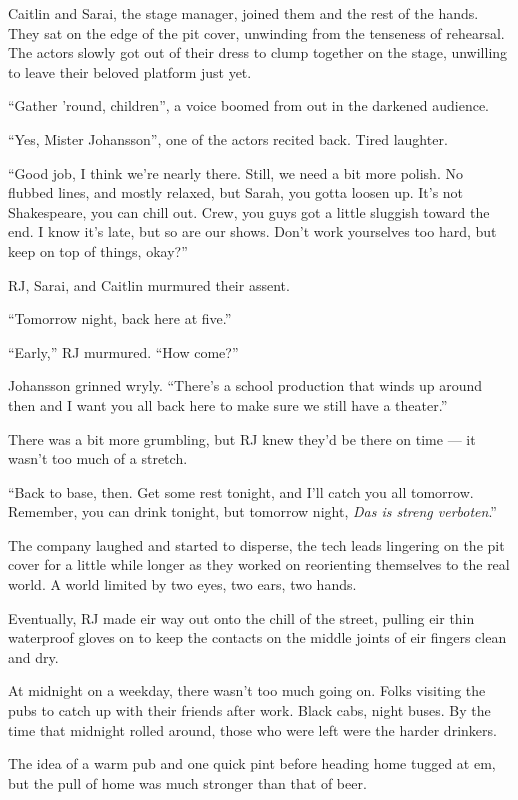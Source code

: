 Caitlin and Sarai, the stage manager, joined them and the rest of the hands. They sat on the edge of the pit cover, unwinding from the tenseness of rehearsal. The actors slowly got out of their dress to clump together on the stage, unwilling to leave their beloved platform just yet.

``Gather 'round, children'', a voice boomed from out in the darkened audience.

``Yes, Mister Johansson'', one of the actors recited back. Tired laughter.

``Good job, I think we're nearly there. Still, we need a bit more polish. No flubbed lines, and mostly relaxed, but Sarah, you gotta loosen up. It's not Shakespeare, you can chill out. Crew, you guys got a little sluggish toward the end. I know it's late, but so are our shows. Don't work yourselves too hard, but keep on top of things, okay?''

RJ, Sarai, and Caitlin murmured their assent.

``Tomorrow night, back here at five.''

``Early,'' RJ murmured. ``How come?''

Johansson grinned wryly. ``There's a school production that winds up around then and I want you all back here to make sure we still have a theater.''

There was a bit more grumbling, but RJ knew they'd be there on time — it wasn't too much of a stretch.

``Back to base, then. Get some rest tonight, and I'll catch you all tomorrow. Remember, you can drink tonight, but tomorrow night, \emph{Das is streng verboten}.''

The company laughed and started to disperse, the tech leads lingering on the pit cover for a little while longer as they worked on reorienting themselves to the real world. A world limited by two eyes, two ears, two hands.

Eventually, RJ made eir way out onto the chill of the street, pulling eir thin waterproof gloves on to keep the contacts on the middle joints of eir fingers clean and dry.

At midnight on a weekday, there wasn't too much going on. Folks visiting the pubs to catch up with their friends after work. Black cabs, night buses. By the time that midnight rolled around, those who were left were the harder drinkers.

The idea of a warm pub and one quick pint before heading home tugged at em, but the pull of home was much stronger than that of beer.

